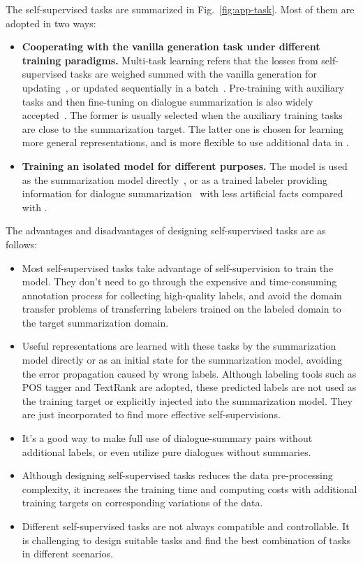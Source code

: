 The self-supervised tasks are summarized in Fig.~\ref{fig:app-task}. Most of them are adopted in two ways:
\begin{itemize}
	\item \textbf{Cooperating with the vanilla generation task under 
different training paradigms.}	
{Multi-task learning refers that the losses from self-supervised tasks are weighed summed with the vanilla generation for updating}~\cite{zhao2021give,fuzw20}, or updated sequentially in a batch~\cite{liu2021topic}. 
Pre-training with auxiliary tasks and then fine-tuning on dialogue summarization is also widely accepted~\cite{khalifa2021bag,qi2021improving}. 
The former is usually selected when the auxiliary training tasks are close to the summarization target. 
The latter one is chosen for learning more general representations, and is more flexible to use additional data in . 
	\item \textbf{Training an isolated model for different purposes.} 
The model is used as the summarization model directly~\cite{zou2021unsupervised, feigenblat-etal-2021-tweetsumm-dialog}, or as a trained labeler providing information for dialogue summarization~\cite{feigenblat-etal-2021-tweetsumm-dialog} with less artificial facts compared with \citet{feng2021language}. 
	
	

\end{itemize}


The advantages and disadvantages of designing self-supervised tasks are as follows:
\begin{itemize}
	\item[\Checkmark] Most self-supervised tasks take advantage of 
self-supervision to train the model. They don't need to go through
the expensive and time-consuming annotation process for collecting 
high-quality labels, and avoid the domain transfer problems 
of transferring labelers trained on the labeled domain to the target 
summarization domain.
	\item[\Checkmark] Useful representations are learned with these tasks by the summarization model directly or as an initial state for the summarization model, avoiding the error propagation caused by wrong labels. Although labeling tools such as POS tagger and TextRank are adopted, these predicted labels are not used as the training target or explicitly injected into the summarization model. They are just incorporated to find more effective self-supervisions.
	\item[\Checkmark] It's a good way to make full use of dialogue-summary 
pairs without additional labels, or even utilize pure dialogues without 
summaries.
	\item[\XSolidBrush] Although designing 
self-supervised tasks reduces the data pre-processing complexity, 
it increases the training time and computing costs with additional training targets 
on corresponding variations of the data.
	\item[\XSolidBrush] Different self-supervised tasks are not always 
compatible and controllable. It is challenging to design suitable tasks and 
find the best combination of tasks in different scenarios.
\end{itemize}


